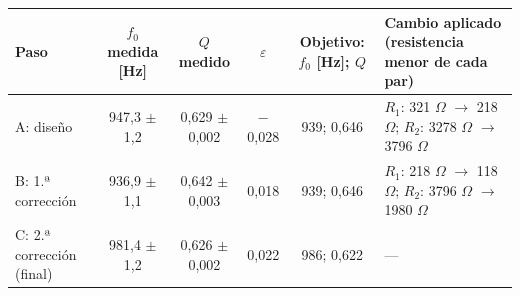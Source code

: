 \begin{tabular}{@{}lccccl@{}}
\toprule
Paso & $f_0$ medida [Hz] & $Q$ medido & $\varepsilon$ & Objetivo: $f_0$ [Hz]; $Q$ & Cambio aplicado (resistencia menor de cada par) \\
\midrule
A: diseño & 947{,}3 $\pm$ 1{,}2 & 0{,}629 $\pm$ 0{,}002 & $-$0{,}028 & 939; 0{,}646 & $R_1$: 321 $\Omega$ $\rightarrow$ 218 $\Omega$; $R_2$: 3278 $\Omega$ $\rightarrow$ 3796 $\Omega$ \\
B: 1.ª corrección & 936{,}9 $\pm$ 1{,}1 & 0{,}642 $\pm$ 0{,}003 & 0{,}018 & 939; 0{,}646 & $R_1$: 218 $\Omega$ $\rightarrow$ 118 $\Omega$; $R_2$: 3796 $\Omega$ $\rightarrow$ 1980 $\Omega$ \\
C: 2.ª corrección (final) & 981{,}4 $\pm$ 1{,}2 & 0{,}626 $\pm$ 0{,}002 & 0{,}022 & 986; 0{,}622 & --- \\
\bottomrule
\end{tabular}
